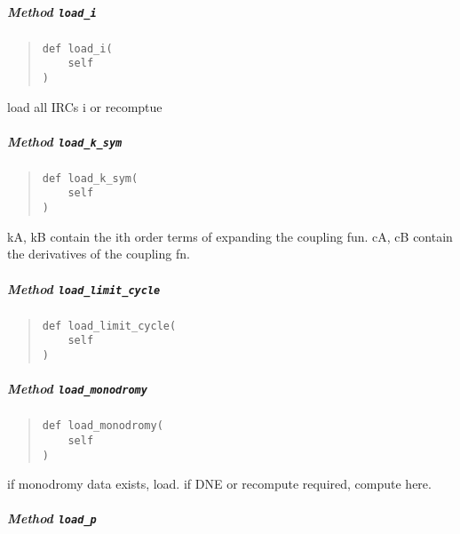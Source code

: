 \documentclass[
  english,
  a4paper,
  oneside]{article}
\begin{document}
\hypertarget{StrongCoupling.StrongCoupling.load_i}{%
\subparagraph{\texorpdfstring{Method
\texttt{load\_i}}{Method load\_i}}\label{StrongCoupling.StrongCoupling.load_i}}

\begin{quote}
\begin{verbatim}
def load_i(
    self
)
\end{verbatim}
\end{quote}

load all IRCs i or recomptue

\hypertarget{StrongCoupling.StrongCoupling.load_k_sym}{%
\subparagraph{\texorpdfstring{Method
\texttt{load\_k\_sym}}{Method load\_k\_sym}}\label{StrongCoupling.StrongCoupling.load_k_sym}}

\begin{quote}
\begin{verbatim}
def load_k_sym(
    self
)
\end{verbatim}
\end{quote}

kA, kB contain the ith order terms of expanding the coupling fun. cA, cB
contain the derivatives of the coupling fn.

\hypertarget{StrongCoupling.StrongCoupling.load_limit_cycle}{%
\subparagraph{\texorpdfstring{Method
\texttt{load\_limit\_cycle}}{Method load\_limit\_cycle}}\label{StrongCoupling.StrongCoupling.load_limit_cycle}}

\begin{quote}
\begin{verbatim}
def load_limit_cycle(
    self
)
\end{verbatim}
\end{quote}

\hypertarget{StrongCoupling.StrongCoupling.load_monodromy}{%
\subparagraph{\texorpdfstring{Method
\texttt{load\_monodromy}}{Method load\_monodromy}}\label{StrongCoupling.StrongCoupling.load_monodromy}}

\begin{quote}
\begin{verbatim}
def load_monodromy(
    self
)
\end{verbatim}
\end{quote}

if monodromy data exists, load. if DNE or recompute required, compute
here.

\hypertarget{StrongCoupling.StrongCoupling.load_p}{%
\subparagraph{\texorpdfstring{Method
\texttt{load\_p}}{Method load\_p}}\label{StrongCoupling.StrongCoupling.load_p}}
\end{document}
